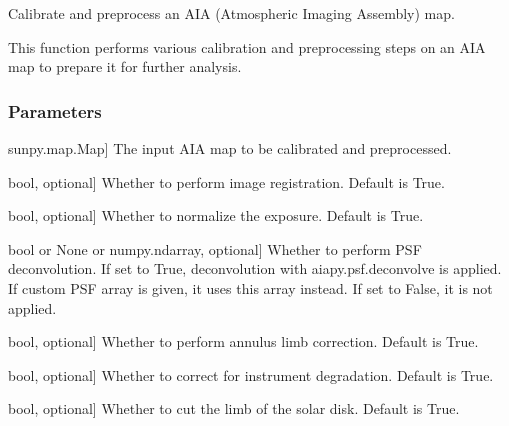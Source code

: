 \documentclass[letterpaper,10pt,english]{sphinxmanual}
\begin{document}
\begin{fulllineitems}
\label{\detokenize{pycatch/utils/calibration:pycatch.utils.calibration.calibrate_aia}}
\pysigstartsignatures
{}
\pysigstopsignatures
\sphinxAtStartPar
Calibrate and preprocess an AIA (Atmospheric Imaging Assembly) map.

\sphinxAtStartPar
This function performs various calibration and preprocessing steps on an AIA map to prepare it for further analysis.


\subsubsection{Parameters}
\label{\detokenize{pycatch/utils/calibration:id1}}\begin{description}
\sphinxlineitem{map}{[}sunpy.map.Map{]}
\sphinxAtStartPar
The input AIA map to be calibrated and preprocessed.

\sphinxlineitem{register}{[}bool, optional{]}
\sphinxAtStartPar
Whether to perform image registration. Default is True.

\sphinxlineitem{normalize}{[}bool, optional{]}
\sphinxAtStartPar
Whether to normalize the exposure. Default is True.

\sphinxlineitem{deconvolve}{[}bool or None or numpy.ndarray, optional{]}
\sphinxAtStartPar
Whether to perform PSF deconvolution. If set to True, deconvolution with aiapy.psf.deconvolve is applied.
If custom PSF array is given, it uses this array instead. If set to False, it is not applied.

\sphinxlineitem{alc}{[}bool, optional{]}
\sphinxAtStartPar
Whether to perform annulus limb correction. Default is True.

\sphinxlineitem{degradation}{[}bool, optional{]}
\sphinxAtStartPar
Whether to correct for instrument degradation. Default is True.

\sphinxlineitem{cut\_limb}{[}bool, optional{]}
\sphinxAtStartPar
Whether to cut the limb of the solar disk. Default is True.


\end{description}
\end{fulllineitems}
\end{document}

